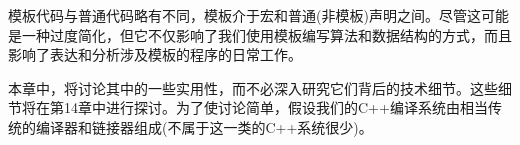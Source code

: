 模板代码与普通代码略有不同，模板介于宏和普通(非模板)声明之间。尽管这可能是一种过度简化，但它不仅影响了我们使用模板编写算法和数据结构的方式，而且影响了表达和分析涉及模板的程序的日常工作。

本章中，将讨论其中的一些实用性，而不必深入研究它们背后的技术细节。这些细节将在第14章中进行探讨。为了使讨论简单，假设我们的C++编译系统由相当传统的编译器和链接器组成(不属于这一类的C++系统很少)。